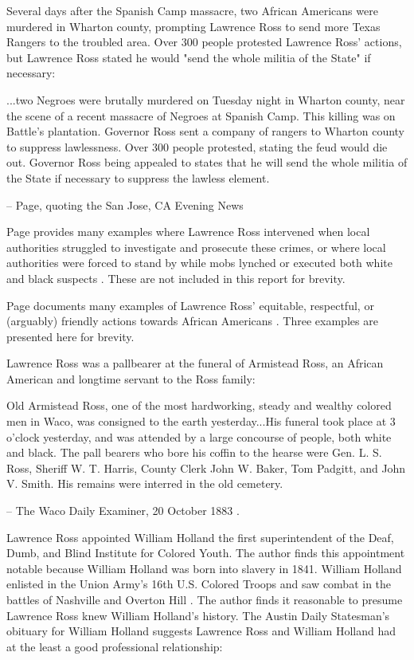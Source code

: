 \documentclass[12pt]{article}
\begin{document}
Several days after the Spanish Camp massacre, two African Americans were murdered in Wharton county, prompting Lawrence Ross to send more Texas Rangers to the troubled area. Over 300 people protested Lawrence Ross' actions, but Lawrence Ross stated he would "send the whole militia of the State" if necessary:
\begin{displayquote}
...two Negroes were brutally murdered on Tuesday night in Wharton county, near the scene of a recent massacre of Negroes at Spanish Camp. This killing was on Battle’s plantation. Governor Ross sent a company of rangers to Wharton county to suppress lawlessness. Over 300 people protested, stating the feud would die out. Governor Ross being appealed to states that he will send the whole militia of the State if necessary to suppress the lawless element. 

-- Page, quoting the San Jose, CA Evening News \cite[pg. 101]{page} 
\end{displayquote}

Page provides many examples where Lawrence Ross intervened when local authorities struggled to investigate and prosecute these crimes, or where local authorities were forced to stand by while mobs lynched or executed both white and black suspects \cite[pg. 95--155, etc]{page}. These are not included in this report for brevity.

Page documents many examples of Lawrence Ross' equitable, respectful, or (arguably) friendly actions towards African Americans \cite{page}. Three examples are presented here for brevity.

Lawrence Ross was a pallbearer at the funeral of Armistead Ross, an African American and longtime servant to the Ross family:
\begin{displayquote}
Old Armistead Ross, one of the most hardworking, steady and wealthy colored men in Waco, was consigned to the earth yesterday...His funeral took place at 3 o’clock yesterday, and was attended by a large concourse of people, both white and black. The pall bearers who bore his coffin to the hearse were Gen. L. S. Ross, Sheriff W. T. Harris, County Clerk John W. Baker, Tom Padgitt, and John V. Smith. His remains were interred in the old cemetery.

-- The Waco Daily Examiner, 20 October 1883 \cite{wde:1883-10-20}.
\end{displayquote}

Lawrence Ross appointed William Holland the first superintendent of the Deaf, Dumb, and Blind Institute for Colored Youth. The author finds this appointment notable because William Holland was born into slavery in 1841. William Holland enlisted in the Union Army's 16th U.S. Colored Troops and saw combat in the battles of Nashville and Overton Hill \cite{tsha:willholland}. The author finds it reasonable to presume Lawrence Ross knew William Holland's history. The Austin Daily Statesman's obituary for William Holland suggests Lawrence Ross and William Holland had at the least a good professional relationship:
\end{document}
